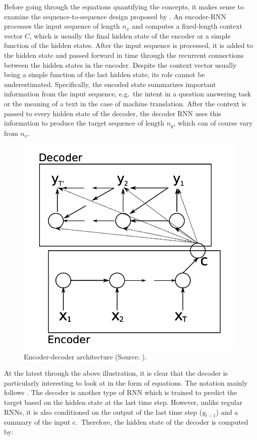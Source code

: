 \documentclass[
]{krantz}
\begin{document}
Before going through the equations quantifying the concepts, it makes
sense to examine the sequence-to-sequence design
proposed by \citet{Cho2014}. An encoder-RNN processes the input sequence of
length \(n_x\) and computes a fixed-length context vector \(C\), which is
usually the final hidden state of the encoder or a simple function of
the hidden states. After the input sequence is processed, it is added to
the hidden state and passed forward in time through the recurrent
connections between the hidden states in the encoder. Despite the
context vector usually being a simple function of the last hidden state,
its role cannot be underestimated. Specifically, the encoded state
summarizes important information from the input sequence, e.g.~the
intent in a question answering task or the meaning of a text in the case
of machine translation. After the context is passed to every hidden
state of the decoder, the decoder RNN uses this information to produce
the target sequence of length \(n_y\), which can of course vary from
\(n_x\).

\begin{figure}

{\centering \includegraphics[width=0.56\linewidth]{./figures/01-01-nlp/encdec_arch_Cho} 

}

\caption{Encoder-decoder architecture (Source: \citet{Cho2014}).}\label{fig:encdecArchCho}
\end{figure}



At the latest through the above illustration, it is clear that the
decoder is particularly interesting to look at in the form of equations.
The notation mainly follows \citet{Cho2014}. The decoder is another type of
RNN which is trained to predict the target based on the hidden state at
the last time step. However, unlike regular RNNs, it is also conditioned
on the output of the last time step (\(y_{t-1}\)) and a summary of the
input c.~Therefore, the hidden state of the decoder is computed by:
\end{document}
